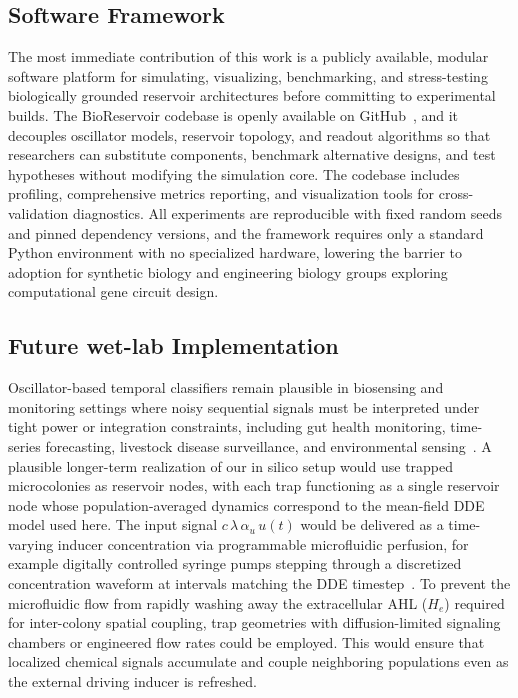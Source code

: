 \documentclass[journal=asbcd6,manuscript=article,keywords]{achemso}
\begin{document}
\subsection{Software Framework}
The most immediate contribution of this work is a publicly available, modular software platform for simulating, visualizing, benchmarking, and stress-testing biologically grounded reservoir architectures before committing to experimental builds. 
The BioReservoir codebase is openly available on GitHub~\cite{JamesGitHub2024}, and it decouples oscillator models, reservoir topology, and readout algorithms so that researchers can substitute components, benchmark alternative designs, and test hypotheses without modifying the simulation core. 
The codebase includes profiling, comprehensive metrics reporting, and visualization tools for cross-validation diagnostics. 
All experiments are reproducible with fixed random seeds and pinned dependency versions, and the framework requires only a standard Python environment with no specialized hardware, lowering the barrier to adoption for synthetic biology and engineering biology groups exploring computational gene circuit design.

\subsection{Future wet-lab Implementation}
Oscillator-based temporal classifiers remain plausible in biosensing and monitoring settings where noisy sequential signals must be interpreted under tight power or integration constraints, including gut health monitoring, time-series forecasting, livestock disease surveillance, and environmental sensing~\cite{Chancharoenthana2023,Guerra2023,Wang2022,Negahdary2023}.
A plausible longer-term realization of our in silico setup would use trapped microcolonies as reservoir nodes, with each trap functioning as a single reservoir node whose population-averaged dynamics correspond to the mean-field DDE model used here.
The input signal $c \, \lambda \, \alpha_u \, u(t)$ would be delivered as a time-varying inducer concentration via programmable microfluidic perfusion, for example digitally controlled syringe pumps stepping through a discretized concentration waveform at intervals matching the DDE timestep~\cite{Rackus2015}.
To prevent the microfluidic flow from rapidly washing away the extracellular AHL ($H_e$) required for inter-colony spatial coupling, trap geometries with diffusion-limited signaling chambers or engineered flow rates could be employed. This would ensure that localized chemical signals accumulate and couple neighboring populations even as the external driving inducer is refreshed.
\end{document}

